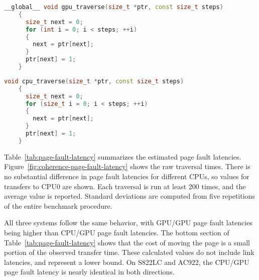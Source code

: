 \begin{lstlisting}[language=c++, caption=GPU Linked List Traversal Kernel for Algorithm~\ref{alg:um-latency}, label=lst:gpu-traversal]
	__global__ void gpu_traverse(size_t *ptr, const size_t steps)
	{
	  size_t next = 0;
	  for (int i = 0; i < steps; ++i)
	  {
		next = ptr[next];
	  }
	  ptr[next] = 1;
	}
	\end{lstlisting}
	
	\begin{lstlisting}[language=c++, caption=CPU Linked List Traversal Function for Algorithm~\ref{alg:um-latency}, label=lst:cpu-traversal]
	void cpu_traverse(size_t *ptr, const size_t steps)
	{
	  size_t next = 0;
	  for (size_t i = 0; i < steps; ++i)
	  {
		next = ptr[next];
	  }
	  ptr[next] = 1;
	}
	\end{lstlisting}

Table~\ref{tab:page-fault-latency} summarizes the estimated page fault latencies.
Figure~\ref{fig:coherence-page-fault-latency} shows the raw traversal times.
There is no substantial difference in page fault latencies for different CPUs, so values for transfers to CPU0 are shown.
Each traversal is run at least 200 times, and the average value is reported.
Standard deviations are computed from five repetitions of the entire benchmark procedure.

All three systems follow the same behavior, with GPU/GPU page fault latencies being higher than CPU/GPU page fault latencies.
The bottom section of Table~\ref{tab:page-fault-latency} shows that the cost of moving the page is a small portion of the observed transfer time.
These calculated values do not include link latencies, and represent a lower bound.
On S822LC and AC922, the CPU/GPU page fault latency is nearly identical in both directions.


